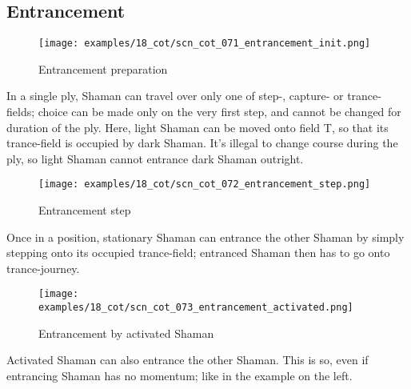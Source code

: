 \vspace*{2.3\baselineskip}

\subsection*{Entrancement}
\label{sec:Conquest of Tlalocan/Trance-journey/Entrancement}

\vspace*{-0.9\baselineskip}
\noindent
\begin{wrapfigure}[13]{l}{0.4\textwidth}
\centering
\texttt{[image: examples/18\_cot/scn\_cot\_071\_entrancement\_init.png]}
\vspace*{-0.4\baselineskip}
\caption{Entrancement preparation}
\label{fig:scn_cot_071_entrancement_init}
\end{wrapfigure}
In a single ply, Shaman can travel over only one of step-, capture- or trance-fields;
choice can be made only on the very first step, and cannot be changed for duration of
the ply. \newline
\indent
Here, light Shaman can be moved onto field T, so that its trance-field is occupied by
dark Shaman. It's illegal to change course during the ply, so light Shaman cannot
entrance dark Shaman outright.

\clearpage %

\noindent
\begin{wrapfigure}[6]{l}{0.4\textwidth}
\centering
\texttt{[image: examples/18\_cot/scn\_cot\_072\_entrancement\_step.png]}
\vspace*{-0.4\baselineskip}
\caption{Entrancement step}
\label{fig:scn_cot_072_entrancement_step}
\end{wrapfigure}
Once in a position, stationary Shaman can entrance the other Shaman by simply stepping
onto its occupied trance-field; entranced Shaman then has to go onto trance-journey.

\vspace*{5.1\baselineskip}

\noindent
\begin{wrapfigure}[8]{l}{0.4\textwidth}
\centering
\texttt{[image: examples/18\_cot/scn\_cot\_073\_entrancement\_activated.png]}
\vspace*{-0.4\baselineskip}
\caption{Entrancement by activated Shaman}
\label{fig:scn_cot_073_entrancement_activated}
\end{wrapfigure}
Activated Shaman can also entrance the other Shaman. This is so, even if entrancing
Shaman has no momentum; like in the example on the left.

